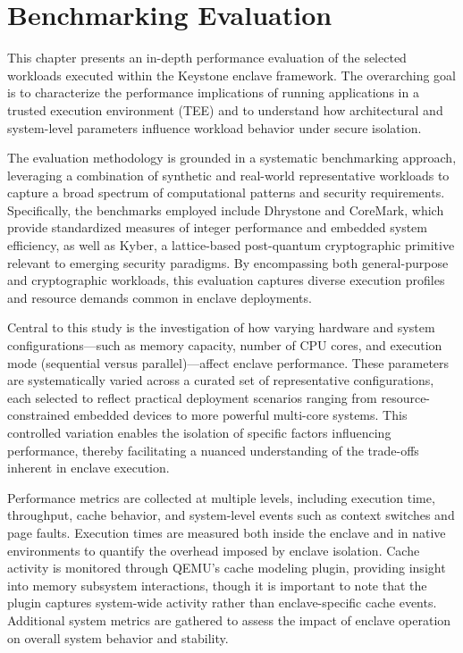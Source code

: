 \chapter{Benchmarking Evaluation}
\label{chap:benchmarking}

This chapter presents an in-depth performance evaluation of the selected workloads executed within the Keystone enclave framework. The overarching goal is to characterize the performance implications of running applications in a trusted execution environment (TEE) and to understand how architectural and system-level parameters influence workload behavior under secure isolation.

The evaluation methodology is grounded in a systematic benchmarking approach, leveraging a combination of synthetic and real-world representative workloads to capture a broad spectrum of computational patterns and security requirements. Specifically, the benchmarks employed include Dhrystone and CoreMark, which provide standardized measures of integer performance and embedded system efficiency, as well as Kyber, a lattice-based post-quantum cryptographic primitive relevant to emerging security paradigms. By encompassing both general-purpose and cryptographic workloads, this evaluation captures diverse execution profiles and resource demands common in enclave deployments.

Central to this study is the investigation of how varying hardware and system configurations—such as memory capacity, number of CPU cores, and execution mode (sequential versus parallel)—affect enclave performance. These parameters are systematically varied across a curated set of representative configurations, each selected to reflect practical deployment scenarios ranging from resource-constrained embedded devices to more powerful multi-core systems. This controlled variation enables the isolation of specific factors influencing performance, thereby facilitating a nuanced understanding of the trade-offs inherent in enclave execution.

Performance metrics are collected at multiple levels, including execution time, throughput, cache behavior, and system-level events such as context switches and page faults. Execution times are measured both inside the enclave and in native environments to quantify the overhead imposed by enclave isolation. Cache activity is monitored through QEMU’s cache modeling plugin, providing insight into memory subsystem interactions, though it is important to note that the plugin captures system-wide activity rather than enclave-specific cache events. Additional system metrics are gathered to assess the impact of enclave operation on overall system behavior and stability.

